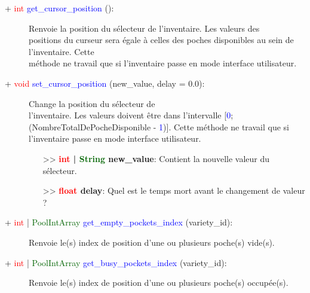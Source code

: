 \documentclass[a4paper, 11pt]{article}
\begin{document}
	\begin{description}
		\item [+ \textcolor{red}{int} \textcolor{blue}{get\_cursor\_position} ():] Renvoie la position du
		sélecteur de l'inventaire. Les valeurs des \\positions du curseur sera égale à celles des poches 
		disponibles au sein de l'inventaire. Cette \\méthode ne travail que si l'inventaire passe en mode 
		interface utilisateur.\\
	\end{description}
	\begin{description}
		\item [+ \textcolor{red}{void} \textcolor{blue}{set\_cursor\_position} (new\_value, delay = 0.0):] 
		Change la position du sélecteur de \\l'inventaire. Les valeurs doivent être dans l'intervalle 
		[\textcolor{blue}{0}; (NombreTotalDePocheDisponible - \textcolor{blue}{1})]. Cette méthode ne 
		travail que si l'inventaire passe en mode interface utilisateur.
		\begin{itemize}
			\item[>> \textbf{\textcolor{red}{int} | \textcolor{darkgreen}{String} new\_value}:] Contient la 
			nouvelle valeur du sélecteur.
			\item [>> \textbf{\textcolor{red}{float} delay}:] Quel est le temps mort avant le changement de 
			valeur ?\\
		\end{itemize}
	\end{description}
	\begin{description}
		\item [+ \textcolor{red}{int} | \textcolor{darkgreen}{PoolIntArray} \textcolor{blue}
		{get\_empty\_pockets\_index} (variety\_id):] Renvoie le(s) index de position d'une ou plusieurs 
		poche(s) vide(s).\\
	\end{description}
	\begin{description}
		\item [+ \textcolor{red}{int} | \textcolor{darkgreen}{PoolIntArray} \textcolor{blue}
		{get\_busy\_pockets\_index} (variety\_id):] Renvoie le(s) index de position d'une ou plusieurs 
		poche(s) occupée(s).\\
	\end{description}
\end{document}
